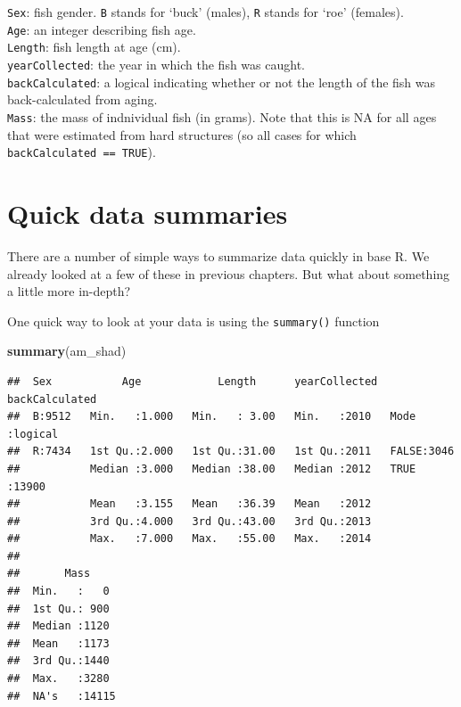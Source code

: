 \documentclass[
]{book}
\newenvironment{Shaded}{\begin{snugshade}}{\end{snugshade}}
\newcommand{\KeywordTok}[1]{\textcolor[rgb]{0.13,0.29,0.53}{\textbf{#1}}}
\newcommand{\NormalTok}[1]{#1}
\begin{document}
\texttt{Sex}: fish gender. \texttt{B} stands for `buck' (males), \texttt{R} stands for `roe' (females).\\

\texttt{Age}: an integer describing fish age.\\

\texttt{Length}: fish length at age (cm).\\

\texttt{yearCollected}: the year in which the fish was caught.\\

\texttt{backCalculated}: a logical indicating whether or not the length
of the fish was back-calculated from aging.\\

\texttt{Mass}: the mass of indnividual fish (in grams). Note that this is NA
for all ages that were estimated from hard structures (so all
cases for which \texttt{backCalculated\ ==\ TRUE}).

\hypertarget{quick-data-summaries}{%
\section{Quick data summaries}\label{quick-data-summaries}}

There are a number of simple ways to summarize data quickly in base R. We already looked at a few of these in previous chapters. But what about something a little more in-depth?

One quick way to look at your data is using the \texttt{summary()} function

\begin{Shaded}
\begin{Highlighting}[]
\KeywordTok{summary}\NormalTok{(am_shad)}
\end{Highlighting}
\end{Shaded}

\begin{verbatim}
##  Sex           Age            Length      yearCollected  backCalculated 
##  B:9512   Min.   :1.000   Min.   : 3.00   Min.   :2010   Mode :logical  
##  R:7434   1st Qu.:2.000   1st Qu.:31.00   1st Qu.:2011   FALSE:3046     
##           Median :3.000   Median :38.00   Median :2012   TRUE :13900    
##           Mean   :3.155   Mean   :36.39   Mean   :2012                  
##           3rd Qu.:4.000   3rd Qu.:43.00   3rd Qu.:2013                  
##           Max.   :7.000   Max.   :55.00   Max.   :2014                  
##                                                                         
##       Mass      
##  Min.   :   0   
##  1st Qu.: 900   
##  Median :1120   
##  Mean   :1173   
##  3rd Qu.:1440   
##  Max.   :3280   
##  NA's   :14115
\end{verbatim}
\end{document}
